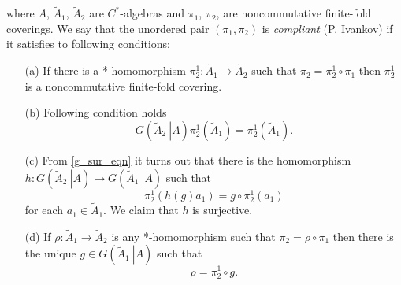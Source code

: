 \documentclass{beamer}
\theoremstyle{plain}
\newcommand{\be}{\begin{equation}}
\newcommand{\ee}{\end{equation}}
\begin{document}
	where $A$, $\widetilde A_1$, $\widetilde A_2$ are $C^*$-algebras and $\pi_1$, $\pi_2$, are noncommutative finite-fold coverings. We say that the unordered pair $\left( \pi_1,\pi_2\right) $ is \textit{compliant} (\alert{P. Ivankov}) if  it satisfies to following conditions:
	\begin{enumerate}
		\item[(a)]
		If there is a *-homomorphism $\pi^1_2: \widetilde A_1 \to \widetilde A_2$ such that $\pi_2 = \pi^1_2 \circ \pi_1$ then $\pi^1_2$ is  a noncommutative finite-fold  covering.
		\item[(b)] Following condition holds
		\be\label{g_sur_eqn}
		G\left(\left.\widetilde A_2~\right|A \right)\pi^1_2\left(\widetilde A_1\right)=  \pi^1_2\left(\widetilde A_1\right).
		\ee 
\pagebreak
\newline
		\item[(c)] From \eqref{g_sur_eqn} it turns out that there is the homomorphism $h: G\left(\left.\widetilde A_2~\right|A \right)\to 	G\left(\left.\widetilde A_1~\right|A \right)$ such that 
		$$
		\pi^1_2\left( h\left(g \right)a_1\right) = g \circ \pi^1_2\left(a_1 \right)
		$$
		for each $a_1 \in \widetilde A_1$.  
		We claim that $h$ is surjective. 
		\item[(d)] If  $\rho: \widetilde A_1 \to \widetilde A_2$ is any *-homomorphism  such that $\pi_2 = \rho \circ \pi_1$ then there is the unique $g \in 	G\left(\left.\widetilde A_1~\right|A \right)$ such that 
		\be\label{compliant_covering_g_eqn}
		\rho =  \pi^1_2 \circ g.
		\ee
		\newline
	\end{enumerate}
\end{document}
